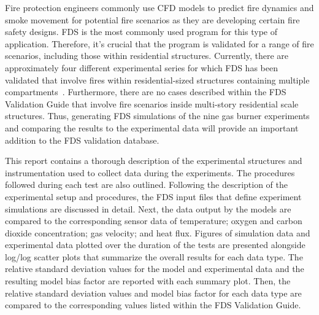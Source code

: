 Fire protection engineers commonly use CFD models to predict fire dynamics and smoke movement for potential fire scenarios as they are developing certain fire safety designs. FDS is the most commonly used program for this type of application. Therefore, it's crucial that the program is validated for a range of fire scenarios, including those within residential structures. Currently, there are approximately four different experimental series for which FDS has been validated that involve fires within residential-sized structures containing multiple compartments~\cite{FDS_Validation_Guide}. Furthermore, there are no cases described within the FDS Validation Guide that involve fire scenarios inside multi-story residential scale structures. Thus, generating FDS simulations of the nine gas burner experiments and comparing the results to the experimental data will provide an important addition to the FDS validation database.

This report contains a thorough description of the experimental structures and instrumentation used to collect data during the experiments. The procedures followed during each test are also outlined. Following the description of the experimental setup and procedures, the FDS input files that define experiment simulations are discussed in detail. Next, the data output by the models are compared to the corresponding sensor data of temperature; oxygen and carbon dioxide concentration; gas velocity; and heat flux. Figures of simulation data and experimental data plotted over the duration of the tests are presented alongside log/log scatter plots that summarize the overall results for each data type. The relative standard deviation values for the model and experimental data and the resulting model bias factor are reported with each summary plot. Then, the relative standard deviation values and model bias factor for each data type are compared to the corresponding values listed within the FDS Validation Guide. 